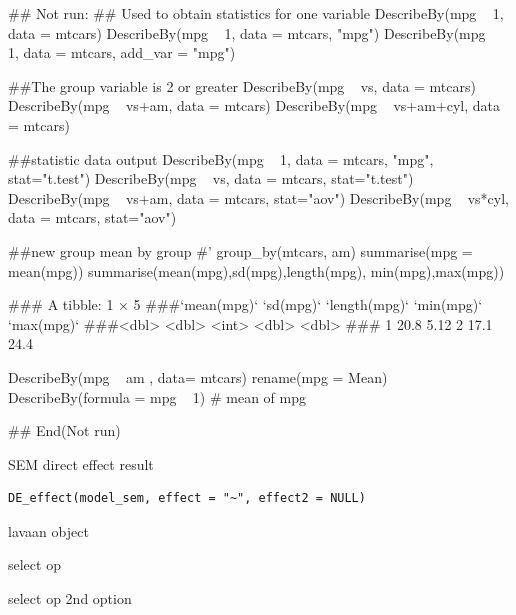 \documentclass[a4paper]{book}
\begin{document}
\begin{Examples}
\begin{ExampleCode}
\#\# Not run: 
## Used to obtain statistics for one variable
DescribeBy(mpg ~ 1, data = mtcars)
DescribeBy(mpg ~ 1, data = mtcars, "mpg")
DescribeBy(mpg ~ 1, data = mtcars, add_var = "mpg")

##The group variable is 2 or greater
DescribeBy(mpg ~ vs, data = mtcars)
DescribeBy(mpg ~ vs+am, data = mtcars)
DescribeBy(mpg ~ vs+am+cyl, data = mtcars)

##statistic data output
DescribeBy(mpg ~ 1, data = mtcars, "mpg", stat="t.test")
DescribeBy(mpg ~ vs, data = mtcars, stat="t.test")
DescribeBy(mpg ~ vs+am, data = mtcars, stat="aov")
DescribeBy(mpg ~ vs*cyl, data = mtcars, stat="aov")

##new group mean by group
#' group_by(mtcars, am) %
 summarise(mpg = mean(mpg)) %
  summarise(mean(mpg),sd(mpg),length(mpg), min(mpg),max(mpg))

### A tibble: 1 × 5
###`mean(mpg)` `sd(mpg)` `length(mpg)` `min(mpg)` `max(mpg)`
###<dbl>     <dbl>         <int>      <dbl>      <dbl>
###  1        20.8      5.12             2       17.1       24.4

DescribeBy(mpg ~ am , data= mtcars) %
    rename(mpg = Mean) %
      DescribeBy(formula = mpg ~ 1)  # mean of mpg

## End(Not run)



\end{ExampleCode}
\end{Examples}
%
\begin{Description}
SEM direct effect result
\end{Description}
%
\begin{Usage}
\begin{verbatim}
DE_effect(model_sem, effect = "~", effect2 = NULL)
\end{verbatim}
\end{Usage}
%
\begin{Arguments}
\begin{ldescription}
\item[\code{model\_sem}] lavaan object

\item[\code{effect}] select op

\item[\code{effect2}] select op 2nd option
\end{ldescription}
\end{Arguments}
\end{document}
